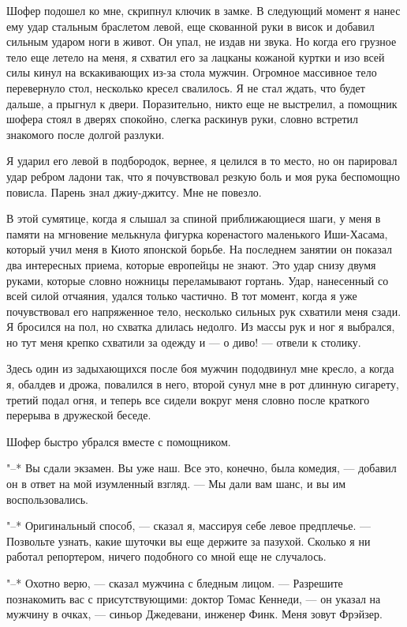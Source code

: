 Шофер подошел ко мне, скрипнул ключик в замке.  В  следующий  момент  я
нанес ему удар стальным браслетом левой, еще  скованной  руки  в  висок  и
добавил сильным ударом ноги в живот. Он упал, не издав ни звука. Но  когда
его грузное тело еще летело на меня, я  схватил  его  за  лацканы  кожаной
куртки и изо всей силы кинул на вскакивающих из-за стола мужчин.  Огромное
массивное тело перевернуло стол, несколько кресел  свалилось.  Я  не  стал
ждать, что будет дальше, а прыгнул к двери.  Поразительно,  никто  еще  не
выстрелил, а помощник шофера стоял  в  дверях  спокойно,  слегка  раскинув
руки, словно встретил знакомого после долгой разлуки.

Я ударил его левой в подбородок, вернее, я целился в то  место,  но  он
парировал удар ребром ладони так, что я почувствовал  резкую  боль  и  моя
рука беспомощно повисла. Парень знал джиу-джитсу. Мне не повезло.

В этой сумятице, когда я слышал за спиной приближающиеся шаги, у меня в
памяти на мгновение мелькнула фигурка коренастого  маленького  Иши-Хасама,
который учил меня в Киото японской борьбе. На последнем занятии он показал
два интересных приема, которые европейцы не знают. Это  удар  снизу  двумя
руками, которые словно ножницы переламывают гортань. Удар,  нанесенный  со
всей силой отчаяния, удался только частично. В тот  момент,  когда  я  уже
почувствовал его напряженное тело, несколько  сильных  рук  схватили  меня
сзади. Я бросился на пол, но схватка длилась недолго. Из массы рук и ног я
выбрался, но тут меня крепко схватили за одежду и --- о  диво!  ---  отвели  к
столику.

Здесь один из задыхающихся после боя мужчин пододвинул  мне  кресло,  а
когда я, обалдев и дрожа, повалился в него, второй сунул мне в рот длинную
сигарету, третий подал огня, и теперь все сидели вокруг меня словно  после
краткого перерыва в дружеской беседе.

Шофер быстро убрался вместе с помощником.

"--* Вы сдали экзамен. Вы уже наш.  Все  это,  конечно,  была  комедия,  ---
добавил он в ответ на мой изумленный взгляд. --- Мы дали вам шанс, и  вы  им
воспользовались.

"--* Оригинальный способ, --- сказал я, массируя себе  левое  предплечье.  ---
Позвольте узнать, какие шуточки вы еще держите за пазухой.  Сколько  я  ни
работал репортером, ничего подобного со мной еще не случалось.

"--*  Охотно  верю,  ---  сказал  мужчина  с  бледным  лицом.  ---   Разрешите
познакомить вас с присутствующими: доктор Томас Кеннеди, ---  он  указал  на
мужчину в очках, --- синьор Джедевани, инженер Финк. Меня зовут Фрэйзер.

